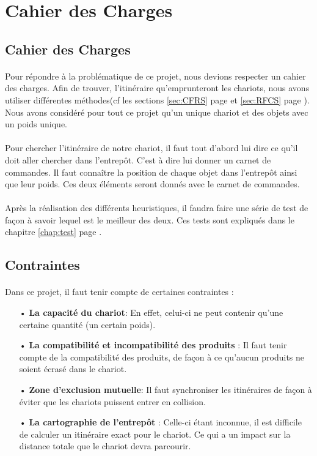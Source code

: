\documentclass[twoside,UTF8]{EPURapport}
\begin{document}
\section{Cahier des Charges}
\subsection{Cahier des Charges}
\paragraph{}Pour répondre à la problématique de ce projet, nous devions respecter un cahier des charges. Afin de trouver, l'itinéraire qu'emprunteront les chariots, nous avons utiliser différentes méthodes(cf les sections \ref{sec:CFRS} page \pageref{sec:CFRS} et \ref{sec:RFCS} page \pageref{sec:RFCS}). Nous avons considéré pour tout ce projet qu'un unique chariot et des objets avec un poids unique. 

\paragraph{}Pour chercher l'itinéraire de notre chariot, il faut tout d'abord lui dire ce qu'il doit aller chercher dans l'entrepôt. C'est à dire lui donner un carnet de commandes. Il faut connaître la position de chaque objet dans l'entrepôt ainsi que leur poids. Ces deux éléments seront donnés avec le carnet de commandes.

\paragraph{}Après la réalisation des différents heuristiques, il faudra faire une série de test de façon à savoir lequel est le meilleur des deux. Ces tests sont expliqués dans le chapitre \ref{chap:test} page \pageref{chap:test}.

\subsection{Contraintes}
\label{sec:Contraintes}
\paragraph{}Dans ce projet, il faut tenir compte de certaines contraintes : 
\begin{itemize}
\item[•]\textbf{La capacité du chariot}: En effet, celui-ci ne peut contenir qu'une certaine quantité (un certain poids).
\item[•]\textbf{La compatibilité et incompatibilité des produits} : Il faut tenir compte de la compatibilité des produits, de façon à ce qu'aucun produits ne soient écrasé dans le chariot.
\item[•]\textbf{Zone d'exclusion mutuelle}: Il faut synchroniser les itinéraires de façon à éviter que les chariots puissent entrer en collision. 
\item[•]\textbf{La cartographie de l'entrepôt} : Celle-ci étant inconnue, il est difficile de calculer un itinéraire exact pour le chariot. Ce qui a un impact sur la distance totale que le chariot devra parcourir.
\end{itemize} 
\end{document}
